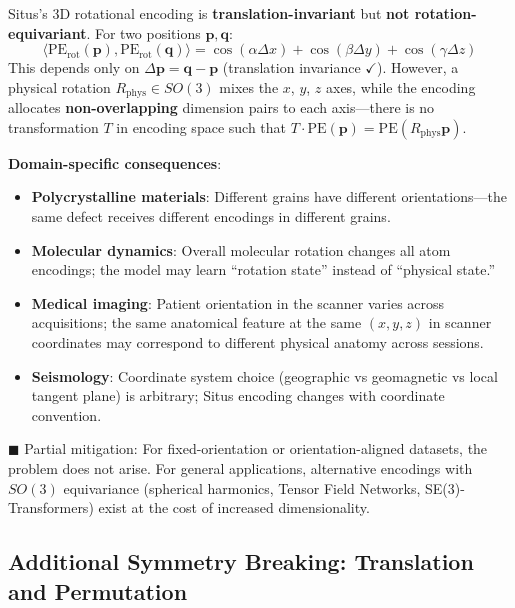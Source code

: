 \documentclass[12pt,a4paper]{article}
\begin{document}
Situs's 3D rotational encoding is \textbf{translation-invariant} but \textbf{not rotation-equivariant}. For two positions $\mathbf{p}, \mathbf{q}$:
\begin{equation}
\langle \mathrm{PE}_{\text{rot}}(\mathbf{p}), \mathrm{PE}_{\text{rot}}(\mathbf{q}) \rangle = \cos(\alpha\Delta x) + \cos(\beta\Delta y) + \cos(\gamma\Delta z)
\end{equation}
This depends only on $\Delta\mathbf{p} = \mathbf{q} - \mathbf{p}$ (translation invariance $\checkmark$). However, a physical rotation $R_{\text{phys}} \in SO(3)$ mixes the $x$, $y$, $z$ axes, while the encoding allocates \textbf{non-overlapping} dimension pairs to each axis---there is no transformation $T$ in encoding space such that $T \cdot \mathrm{PE}(\mathbf{p}) = \mathrm{PE}(R_{\text{phys}}\mathbf{p})$.

\textbf{Domain-specific consequences}:
\begin{itemize}[nosep]
\item \textbf{Polycrystalline materials}: Different grains have different orientations—the same defect receives different encodings in different grains.
\item \textbf{Molecular dynamics}: Overall molecular rotation changes all atom encodings; the model may learn ``rotation state'' instead of ``physical state.''
\item \textbf{Medical imaging}: Patient orientation in the scanner varies across acquisitions; the same anatomical feature at the same $(x,y,z)$ in scanner coordinates may correspond to different physical anatomy across sessions.
\item \textbf{Seismology}: Coordinate system choice (geographic vs geomagnetic vs local tangent plane) is arbitrary; Situs encoding changes with coordinate convention.
\end{itemize}

\textcolor{projected}{$\blacksquare$ Partial mitigation}: For fixed-orientation or orientation-aligned datasets, the problem does not arise. For general applications, alternative encodings with $SO(3)$ equivariance (spherical harmonics, Tensor Field Networks\cite{thomas2018}, SE(3)-Transformers\cite{fuchs2020}) exist at the cost of increased dimensionality.

\subsection{Additional Symmetry Breaking: Translation and Permutation}
\end{document}
